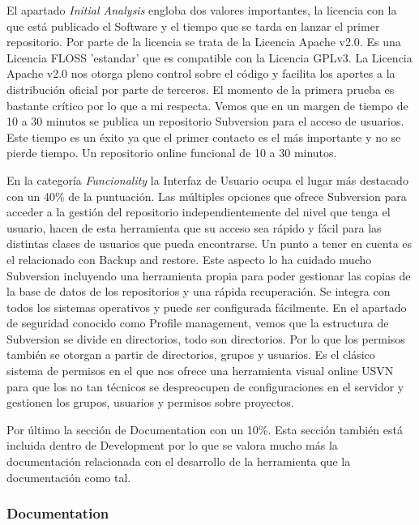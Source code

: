 \documentclass[11pt]{scrartcl}
\begin{document}
\par El apartado \emph{Initial Analysis} engloba dos valores importantes, la licencia con la que est\'a publicado el Software y el tiempo que se tarda en lanzar el primer repositorio. Por parte de la licencia se trata de la Licencia Apache v2.0. Es una Licencia FLOSS 'estandar' que es compatible con la Licencia GPLv3. La Licencia Apache v2.0 nos otorga pleno control sobre el c\'odigo y facilita los aportes a la distribuci\'on oficial por parte de terceros.
El momento de la primera prueba es bastante cr\'itico por lo que a mi respecta. Vemos que en un margen de tiempo de 10 a 30 minutos se publica un repositorio Subversion para el acceso de usuarios. Este tiempo es un \'exito ya que el primer contacto es el m\'as importante y no se pierde tiempo. Un repositorio online funcional de 10 a 30 minutos.

\par En la categor\'ia \emph{Funcionality} la Interfaz de Usuario ocupa el lugar m\'as destacado con un 40\% de la puntuaci\'on. Las m\'ultiples opciones que ofrece Subversion para acceder a la gesti\'on del repositorio independientemente del nivel que tenga el usuario, hacen de esta herramienta que su acceso sea r\'apido y f\'acil para las distintas clases de usuarios que pueda encontrarse.
Un punto a tener en cuenta es el relacionado con Backup and restore. Este aspecto lo ha cuidado mucho Subversion incluyendo una herramienta propia para poder gestionar las copias de la base de datos de los repositorios y una r\'apida recuperaci\'on. Se integra con todos los sistemas operativos y puede ser configurada f\'acilmente.
En el apartado de seguridad conocido como Profile management, vemos que la estructura de Subversion se divide en directorios, todo son directorios. Por lo que los permisos tambi\'en se otorgan a partir de directorios, grupos y usuarios. Es el cl\'asico sistema de permisos en el que nos ofrece una herramienta visual online USVN para que los no tan t\'ecnicos se despreocupen de configuraciones en el servidor y gestionen los grupos, usuarios y permisos sobre proyectos.

\par Por \'ultimo la secci\'on de Documentation con un 10\%. Esta secci\'on tambi\'en est\'a incluida dentro de Development por lo que se valora mucho m\'as la documentaci\'on relacionada con el desarrollo de la herramienta que la documentaci\'on como tal.

\subsubsection{Documentation}
\end{document}
